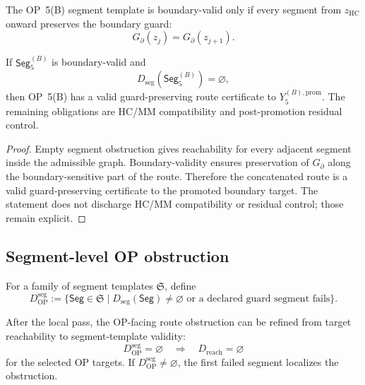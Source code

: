 \begin{definition}
\label{def:v410r15-boundary-segment-guard}
The OP~5(B) segment template is boundary-valid only if every segment from
\(z_{\mathrm{HC}}\) onward preserves the boundary guard:
\[
 G_{\partial}(z_j)=G_{\partial}(z_{j+1}).
\]
\end{definition}

\begin{proposition}
\label{prop:v410r15-op5b-segment-criterion}
If \(\mathsf{Seg}_{5}^{(B)}\) is boundary-valid and
\[
 D_{\mathrm{seg}}(\mathsf{Seg}_{5}^{(B)})=\varnothing,
\]
then OP~5(B) has a valid guard-preserving route certificate to
\(Y_5^{(B),\mathrm{prom}}\). The remaining obligations are HC/MM compatibility
and post-promotion residual control.
\end{proposition}

\begin{proof}
Empty segment obstruction gives reachability for every adjacent segment inside
the admissible graph. Boundary-validity ensures preservation of
\(G_{\partial}\) along the boundary-sensitive part of the route. Therefore the
concatenated route is a valid guard-preserving certificate to the promoted
boundary target. The statement does not discharge HC/MM compatibility or
residual control; those remain explicit.
\end{proof}

\subsection{Segment-level OP obstruction}
\label{subsec:v410r15-segment-level-op-obstruction}

\begin{definition}
\label{def:v410r15-segment-level-op-obstruction}
For a family of segment templates \(\mathfrak S\), define
\[
 D_{\mathrm{OP}}^{\mathrm{seg}}
 :=
 \{\mathsf{Seg}\in\mathfrak S
 \mid
 D_{\mathrm{seg}}(\mathsf{Seg})\neq\varnothing
 \text{ or a declared guard segment fails}\}.
\]
\end{definition}

\begin{theorem}
\label{thm:v410r15-segment-route-reduction}
After the local pass, the OP-facing route obstruction can be refined from target
reachability to segment-template validity:
\[
 D_{\mathrm{OP}}^{\mathrm{seg}}=\varnothing
 \quad\Longrightarrow\quad
 D_{\mathrm{reach}}=\varnothing
\]
for the selected OP targets. If \(D_{\mathrm{OP}}^{\mathrm{seg}}\neq
\varnothing\), the first failed segment localizes the obstruction.
\end{theorem}

